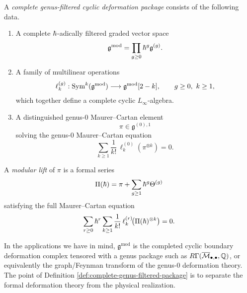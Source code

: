 \begin{definition}
A \emph{complete genus-filtered cyclic deformation package} consists of the following data.
\begin{enumerate}[label=\textup{(\roman*)}]
\item A complete $\hbar$-adically filtered graded vector space
\[
\mathfrak g^{\mathrm{mod}}=\prod_{g\ge 0}\hbar^g\mathfrak g^{(g)}.
\]
\item A family of multilinear operations
\[
\ell_k^{(g)}: \operatorname{Sym}^k(\mathfrak g^{\mathrm{mod}})\longrightarrow
\mathfrak g^{\mathrm{mod}}[2-k],
\qquad g\ge 0,\ k\ge 1,
\]
which together define a complete cyclic $L_\infty$-algebra.
\item A distinguished genus-$0$ Maurer--Cartan element
\[
\pi\in \mathfrak g^{(0),1}
\]
solving the genus-$0$ Maurer--Cartan equation
\[
\sum_{k\ge 1}\frac1{k!}\,\ell_k^{(0)}(\pi^{\otimes k})=0.
\]
\end{enumerate}
A \emph{modular lift} of $\pi$ is a formal series
\[
\Pi(\hbar)=\pi+\sum_{g\ge 1}\hbar^g\Theta^{(g)}
\]
satisfying the full Maurer--Cartan equation
\begin{equation}
\sum_{r\ge 0}\hbar^r\sum_{k\ge 1}\frac1{k!}\,
\ell_k^{(r)}\!\bigl(\Pi(\hbar)^{\otimes k}\bigr)=0.
\end{equation}
\end{definition}

\begin{remark}
In the applications we have in mind, $\mathfrak g^{\mathrm{mod}}$ is the completed cyclic
boundary deformation complex tensored with a genus package such as
$R\Gamma(\overline{\mathcal M}_{\bullet,\bullet},\mathbb Q)$, or equivalently the graph/Feynman transform of the
genus-$0$ deformation theory. The point of Definition
\ref{def:complete-genus-filtered-package} is to separate the formal deformation theory from the
physical realization.
\end{remark}

